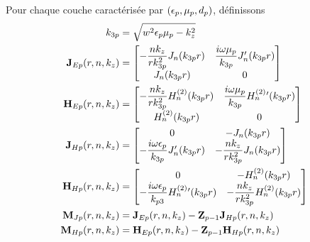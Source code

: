     Pour chaque couche caractérisée par \((\epsilon_p,\mu_p,d_p)\), définissons
    \begin{subequations}
      \begin{align}
        k_{3p} &= \sqrt{w^2\epsilon_p\mu_p - k_z^2}
        \\
        \mathbf{J}_{Ep}(r,n,k_z) &=
          \begin{bmatrix}
            -\dfrac{nk_z}{rk_{3p}^2}J_n(k_{3p}r) & \dfrac{i\omega\mu_p}{k_{3p}}J_n'(k_{3p}r)
            \\
            J_n(k_{3p}r) & 0
          \end{bmatrix}
        \\
        \mathbf{H}_{Ep}(r,n,k_z) &=
          \begin{bmatrix}
            -\dfrac{nk_z}{rk_{3p}^2}H_n^{(2)}(k_{3p}r) & \dfrac{i\omega\mu_p}{k_{3p}}H_n^{(2)}{}'(k_{3p}r)
            \\
            H_n^{(2)}(k_{3p}r) & 0
          \end{bmatrix}
        \\
        \mathbf{J}_{Hp}(r,n,k_z) &=
          \begin{bmatrix}
            0 & -J_n(k_{3p}r)
            \\
            -\dfrac{i\omega\epsilon_p}{k_{3p}}J_n'(k_{3p}r) & -\dfrac{nk_z}{rk_{3p}^2}J_n(k_{3p}r)
          \end{bmatrix}
        \\
        \mathbf{H}_{Hp}(r,n,k_z) &=
          \begin{bmatrix}
            0 & -H_n^{(2)}(k_{3p}r)
            \\
            -\dfrac{i\omega\epsilon_p}{k_{p3}}H_n^{(2)}{}'(k_{3p}r) & -\dfrac{nk_z}{rk_{3p}^2}H_n^{(2)}(k_{3p}r)
          \end{bmatrix}
        \\
        \mathbf{M}_{Jp}(r,n,k_z) &= \mathbf{J}_{Ep}(r,n,k_z) -  \mathbf{Z}_{p-1} \mathbf{J}_{Hp}(r,n,k_z)
        \\
        \mathbf{M}_{Hp}(r,n,k_z) &= \mathbf{H}_{Ep}(r,n,k_z) -  \mathbf{Z}_{p-1} \mathbf{H}_{Hp}(r,n,k_z)
      \end{align}
    \end{subequations}

